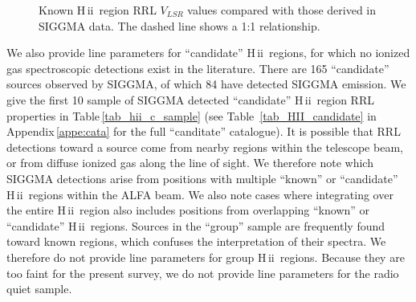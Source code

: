 \documentclass[manuscript]{aastex61}
\newcommand{\hii}{{\rm H\,}{{\sc ii}}}
\begin{document}
\begin{figure}[htbp]
\caption{Known \hii\ region RRL $V_{LSR}$ values compared with
those derived in SIGGMA data.  The dashed line shows a 1:1 relationship.}\label{vlsr_map}
\end{figure}

We also provide line parameters for ``candidate'' \hii\ regions, for which no ionized gas spectroscopic detections exist in the literature.
There are 165 ``candidate'' sources observed by SIGGMA, of which 84 have detected SIGGMA emission.
We give the first 10 sample of SIGGMA detected ``candidate'' \hii\ region RRL properties in Table\,\ref{tab_hii_c_sample} (see Table~\ref{tab_HII_candidate} in Appendix\,\ref{appe:cata} for the full ``canditate'' catalogue).
It is possible that RRL detections toward a source come from nearby regions within the telescope beam, or from diffuse ionized gas along the line of sight.
We therefore note which SIGGMA detections arise from positions with multiple ``known'' or ``candidate'' \hii\ regions within the ALFA beam.  We also note cases where integrating over the entire \hii\ region also includes positions from overlapping ``known'' or ``candidate'' \hii\ regions.
Sources in the ``group'' sample are frequently found toward known regions, which confuses the interpretation of their spectra.
We therefore do not provide line parameters for group \hii\ regions.
Because they are too faint for the present survey, we do not provide line parameters for the radio quiet sample.
\end{document}
